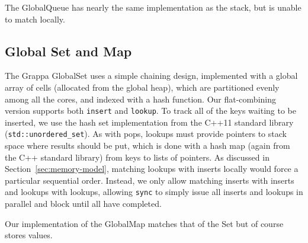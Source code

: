 The GlobalQueue has nearly the same implementation as the stack, but is unable to match locally.

\subsection{Global Set and Map}
The Grappa GlobalSet uses a simple chaining design, implemented with a global array of cells (allocated from the global heap), which are partitioned evenly among all the cores, and indexed with a hash function. Our flat-combining version supports both \texttt{insert} and \texttt{lookup}. To track all of the keys waiting to be inserted, we use the hash set implementation from the C++11 standard library (\texttt{std::unordered\_set}). As with pops, lookups must provide pointers to stack space where results should be put, which is done with a hash map (again from the C++ standard library) from keys to lists of pointers. As discussed in Section~\ref{sec:memory-model}, matching lookups with inserts locally would force a particular sequential order. Instead, we only allow matching inserts with inserts and lookups with lookups, allowing \texttt{sync} to simply issue all inserts and lookups in parallel and block until all have completed.

Our implementation of the GlobalMap matches that of the Set but of course stores values.

